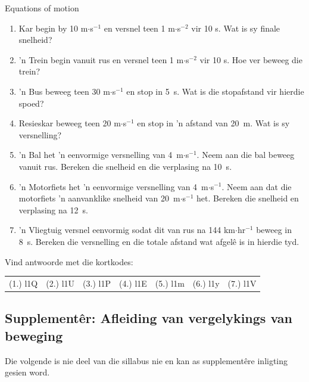 \noindent
\begin{exercises}{Equations of motion}
\nopagebreak \noindent
\begin{enumerate}[noitemsep, label=\textbf{\arabic*}. ] 
    \item \n Kar begin by 10 m$\ensuremath{\cdot}$s${}^{-1}$ en versnel teen 1 m$\ensuremath{\cdot}$s${}^{-2}$ vir 10 s. Wat is sy finale snelheid?
    \item 'n Trein begin vanuit rus en versnel teen 1 m$\ensuremath{\cdot}$s${}^{-2}$ vir 10 s. Hoe ver beweeg die trein?
\item 'n Bus beweeg teen 30 m$\ensuremath{\cdot}$s${}^{-1}$ en stop in 5~s. Wat is die stopafstand vir hierdie spoed?
\item \n Resieskar beweeg teen 20 m$\ensuremath{\cdot}$s${}^{-1}$ en stop in 'n afstand van 20~m. Wat is sy versnelling? 
\item 'n Bal het 'n eenvormige versnelling van 4~m$\ensuremath{\cdot}$s${}^{-1}$. Neem aan die bal beweeg vanuit rus. Bereken die snelheid en die verplasing na 10~s.
\item 'n Motorfiets het 'n eenvormige versnelling van 4~m$\ensuremath{\cdot}$s${}^{-1}$. Neem aan dat die motorfiets 'n aanvanklike snelheid van 20~m$\ensuremath{\cdot}$s${}^{-1}$ het. Bereken die snelheid en verplasing na 12~s.\newline
\item 'n Vliegtuig versnel eenvormig sodat dit van rus na 144 km$\ensuremath{\cdot}$hr${}^{-1}$ beweeg in 8~s. Bereken die versnelling en die totale afstand wat afgel\^e is in hierdie tyd.
\end{enumerate}
    \label{m38796*cid11}
\par {} Vind antwoorde met die kortkodes:
 \par \begin{tabular}[h]{cccccc}
 (1.) l1Q  &  (2.) l1U  &  (3.) l1P  &  (4.) l1E  &  (5.) l1m  &  (6.) l1y  & (7.) l1V \end{tabular}
\end{exercises}

\subsection*{Supplement\^er: Afleiding van vergelykings van beweging}
\nopagebreak
Die volgende is nie deel van die sillabus nie en kan as supplement\^ere inligting gesien word.\par
            
